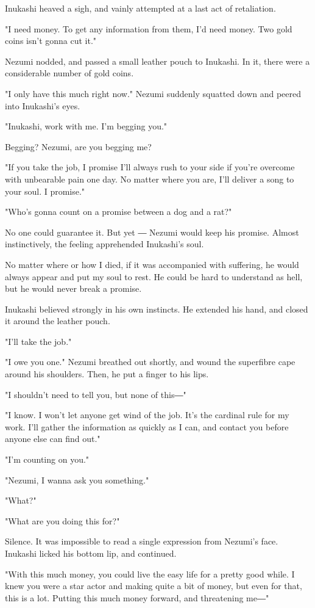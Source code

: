 Inukashi heaved a sigh, and vainly attempted at a last act of
retaliation.

"I need money. To get any information from them, I'd need money. Two
gold coins isn't gonna cut it."

Nezumi nodded, and passed a small leather pouch to Inukashi. In it,
there were a considerable number of gold coins.

"I only have this much right now." Nezumi suddenly squatted down and
peered into Inukashi's eyes.

"Inukashi, work with me. I'm begging you."

Begging? Nezumi, are you begging me?

"If you take the job, I promise I'll always rush to your side if you're
overcome with unbearable pain one day. No matter where you are, I'll
deliver a song to your soul. I promise."

"Who's gonna count on a promise between a dog and a rat?"

No one could guarantee it. But yet ― Nezumi would keep his promise.
Almost instinctively, the feeling apprehended Inukashi's soul.

No matter where or how I died, if it was accompanied with suffering, he
would always appear and put my soul to rest. He could be hard to
understand as hell, but he would never break a promise.

Inukashi believed strongly in his own instincts. He extended his hand,
and closed it around the leather pouch.

"I'll take the job."

"I owe you one." Nezumi breathed out shortly, and wound the superfibre
cape around his shoulders. Then, he put a finger to his lips.

"I shouldn't need to tell you, but none of this―"

"I know. I won't let anyone get wind of the job. It's the cardinal rule
for my work. I'll gather the information as quickly as I can, and
contact you before anyone else can find out."

"I'm counting on you."

"Nezumi, I wanna ask you something."

"What?"

"What are you doing this for?"

Silence. It was impossible to read a single expression from Nezumi's
face. Inukashi licked his bottom lip, and continued.

"With this much money, you could live the easy life for a pretty good
while. I knew you were a star actor and making quite a bit of money, but
even for that, this is a lot. Putting this much money forward, and
threatening me―"

